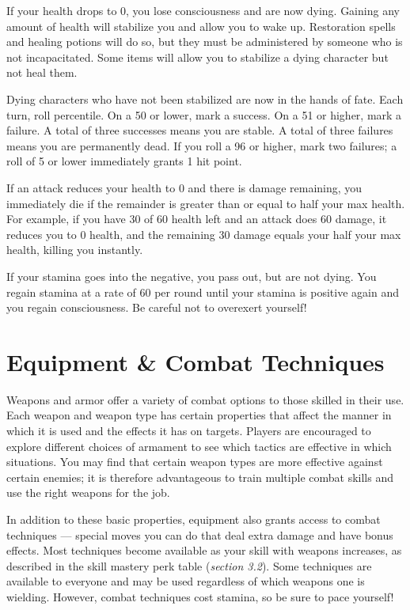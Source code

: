 \documentclass[12pt]{book}
\begin{document}
If your health drops to 0, you lose consciousness and are now dying. Gaining any amount of health will stabilize you and allow you to wake up. Restoration spells and healing potions will do so, but they must be administered by someone who is not incapacitated. Some items will allow you to stabilize a dying character but not heal them.

Dying characters who have not been stabilized are now in the hands of fate. Each turn, roll percentile. On a 50 or lower, mark a success. On a 51 or higher, mark a failure. A total of three successes means you are stable. A total of three failures means you are permanently dead. If you roll a 96 or higher, mark two failures; a roll of 5 or lower immediately grants 1 hit point.

If an attack reduces your health to 0 and there is damage remaining, you immediately die if the remainder is greater than or equal to half your max health. For example, if you have 30 of 60 health left and an attack does 60 damage, it reduces you to 0 health, and the remaining 30 damage equals your half your max health, killing you instantly.

If your stamina goes into the negative, you pass out, but are not dying. You regain stamina at a rate of 60 per round until your stamina is positive again and you regain consciousness. Be careful not to overexert yourself!

\chapter{Equipment \& Combat Techniques}

Weapons and armor offer a variety of combat options to those skilled in their use. Each weapon and weapon type has certain properties that affect the manner in which it is used and the effects it has on targets. Players are encouraged to explore different choices of armament to see which tactics are effective in which situations. You may find that certain weapon types are more effective against certain enemies; it is therefore advantageous to train multiple combat skills and use the right weapons for the job.

In addition to these basic properties, equipment also grants access to combat techniques --- special moves you can do that deal extra damage and have bonus effects. Most techniques become available as your skill with weapons increases, as described in the skill mastery perk table (\textit{section 3.2}). Some techniques are available to everyone and may be used regardless of which weapons one is wielding. However, combat techniques cost stamina, so be sure to pace yourself!
\end{document}
